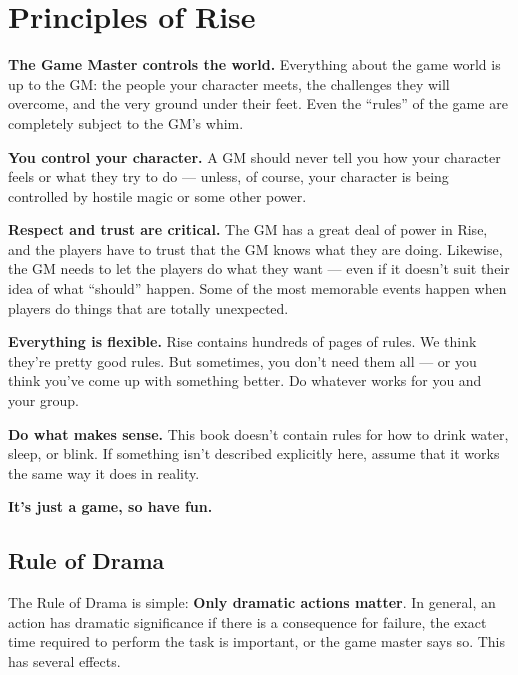 \section{Principles of Rise}

  \begin{raggeditemize}
    \item \textbf{The Game Master controls the world.} Everything about the game world is up to the GM\@: the people your character meets, the challenges they will overcome, and the very ground under their feet.
      Even the ``rules'' of the game are completely subject to the GM's whim.
    \item \textbf{You control your character.} A GM should never tell you how your character feels or what they try to do --- unless, of course, your character is being controlled by hostile magic or some other power.
    \item \textbf{Respect and trust are critical.} The GM has a great deal of power in Rise, and the players have to trust that the GM knows what they are doing.
      Likewise, the GM needs to let the players do what they want --- even if it doesn't suit their idea of what ``should'' happen.
      Some of the most memorable events happen when players do things that are totally unexpected.
    \item \textbf{Everything is flexible.} Rise contains hundreds of pages of rules.
      We think they're pretty good rules.
      But sometimes, you don't need them all --- or you think you've come up with something better.
      Do whatever works for you and your group.
    \item \textbf{Do what makes sense.} This book doesn't contain rules for how to drink water, sleep, or blink.
      If something isn't described explicitly here, assume that it works the same way it does in reality.
    \item \textbf{It's just a game, so have fun.}
  \end{raggeditemize}

  \subsection{Rule of Drama}

    The Rule of Drama is simple: \textbf{Only dramatic actions matter}.
    In general, an action has dramatic significance if there is a consequence for failure, the exact time required to perform the task is important, or the game master says so.
    This has several effects.

